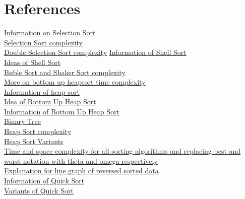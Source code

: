 \documentclass{article}
\begin{document}
\section{References}

\href{https://en.wikipedia.org/wiki/Selection_sort#Complexity}{Information on Selection Sort}\\
\href{https://en.wikipedia.org/wiki/Selection_sort#Complexity}{Selection Sort complexity}\\
\href{https://cs.stackexchange.com/questions/111243/complexity-of-double-selection-sort}{Double Selection Sort complexity}
\href{https://www.geeksforgeeks.org/shellsort/}{Information of Shell Sort}\\
\href{https://en.wikipedia.org/wiki/Shellsort#Description}{Ideas of Shell Sort}\\
\href{https://stackabuse.com/bubble-sort-and-cocktail-shaker-sort-in-javascript/}{Buble Sort and Shaker Sort complexity}\\
\href{https://www.researchgate.net/publication/225806123_A_tight_lower_bound_for_the_worst_case_of_Bottom-Up-Heapsort}{More on bottom up heapsort time complexity}\\
\href{https://www.geeksforgeeks.org/heap-sort/}{Information of heap sort}\\
\href{https://cs.stackexchange.com/questions/11415/how-to-perform-bottom-up-construction-of-heaps}{Idea of Bottom Up Heap Sort}\\
\href{https://www.happycoders.eu/algorithms/heapsort/#Bottom-Up_Heapsort}{Information of Bottom Up Heap Sort}\\
\href{https://en.wikipedia.org/wiki/Binary_tree#Types_of_binary_trees}{Binary Tree}\\
\href{https://www.happycoders.eu/algorithms/heapsort/#Heapsort_Time_Complexity}{Heap Sort complexity}\\
\href{https://en.wikipedia.org/wiki/Heapsort#Variations}{Heap Sort Variants}\\
\href{https://www.geeksforgeeks.org/time-complexities-of-all-sorting-algorithms/}{Time and space complexity for all sorting algorithms and replacing best and worst notation with theta and omega respectively}\\
\href{https://en.wikipedia.org/wiki/Cocktail_shaker_sort#Complexity}{Explanation for line graph of reversed sorted data}\\
\href{https://www.geeksforgeeks.org/quick-sort/}{Information of Quick Sort}\\
\href{https://en.wikipedia.org/wiki/Quicksort#Variants}{Variants of Quick Sort}\\
\end{document}
